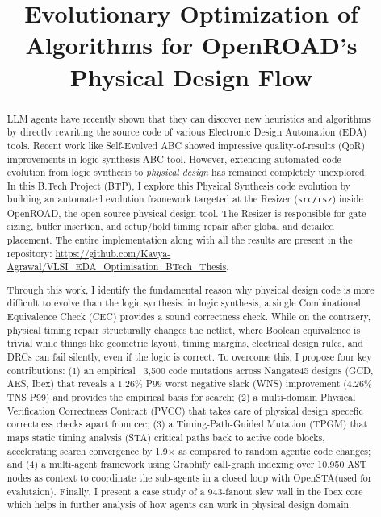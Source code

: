 \documentclass[10pt, conference]{IEEEtran}
\title{Evolutionary Optimization of Algorithms for OpenROAD's Physical Design Flow}
\author{%
  \IEEEauthorblockN{Kavya Kumar Agrawal}
  \IEEEauthorblockA{B. Tech. Project Report\\
  Supervisors: Chandan Karfa and Sukanta Bhattacharjee\\
    Email: \texttt{a.kavya@iitg.ac.in}}
}
\begin{document}
\maketitle

\begin{abstract}
LLM agents have recently shown that they can discover new heuristics and algorithms by directly rewriting the source code of various Electronic Design Automation (EDA) tools. Recent work like Self-Evolved ABC showed impressive quality-of-results (QoR) improvements in logic synthesis ABC tool. However, extending automated code evolution from logic synthesis to \emph{physical design} has remained completely unexplored. In this B.Tech Project (BTP), I explore this Physical Synthesis code evolution by building an automated evolution framework targeted at the Resizer (\texttt{src/rsz}) inside OpenROAD, the open-source physical design tool. The Resizer is responsible for gate sizing, buffer insertion, and setup/hold timing repair after global and detailed placement. The entire implementation along with all the results are present in the repository: \url{https://github.com/Kavya-Agrawal/VLSI_EDA_Optimisation_BTech_Thesis}.

Through this work, I identify the fundamental reason why physical design code is more difficult to evolve than the logic synthesis: in logic synthesis, a single Combinational Equivalence Check (CEC) provides a sound correctness check. While on the contraery, physical timing repair structurally changes the netlist, where Boolean equivalence is trivial while things like geometric layout, timing margins, electrical design rules, and DRCs can fail silently, even if the logic is correct. To overcome this, I propose four key contributions: (1) an empirical ~3{,}500 code mutations across Nangate45 designs (GCD, AES, Ibex) that reveals a 1.26\% P99 worst negative slack (WNS) improvement (4.26\% TNS P99) and provides the empirical basis for search; (2) a multi-domain Physical Verification Correctness Contract (PVCC) that takes care of physical design specefic correctness checks apart from cec; (3) a Timing-Path-Guided Mutation (TPGM) that maps static timing analysis (STA) critical paths back to active code blocks, accelerating search convergence by 1.9$\times$ as compared to random agentic code changes; and (4) a multi-agent framework using Graphify call-graph indexing over 10{,}950 AST nodes as context to coordinate the sub-agents in a closed loop with OpenSTA(used for evalutaion). Finally, I present a case study of a 943-fanout slew wall in the Ibex core which helps in further analysis of how agents can work in physical design domain.
\end{abstract}
\end{document}
